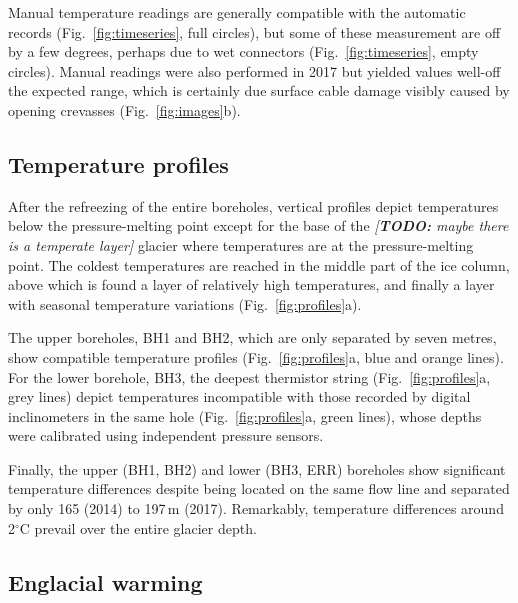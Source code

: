 \documentclass[utf8]{article}
\newcommand{\todo}[1]{\textcolor{c3}{\emph{[\textbf{TODO:} #1]}}}
\begin{document}
    Manual temperature readings are generally compatible with the automatic
    records (Fig.~\ref{fig:timeseries}, full circles), but some of these
    measurement are off by a few degrees, perhaps due to wet connectors
    (Fig.~\ref{fig:timeseries}, empty circles). Manual readings were also
    performed in 2017 but yielded values well-off the expected range, which
    is certainly due surface cable damage visibly caused by opening crevasses
    (Fig.~\ref{fig:images}b).


\subsection{Temperature profiles}

    After the refreezing of the entire boreholes, vertical profiles depict
    temperatures below the pressure-melting point except for the base of the
    \todo{maybe there is a temperate layer}
    glacier where temperatures are at the pressure-melting point. The coldest
    temperatures are reached in the middle part of the ice column, above which
    is found a layer of relatively high temperatures, and finally a layer with
    seasonal temperature variations (Fig.~\ref{fig:profiles}a).

    The upper boreholes, BH1 and BH2, which are only separated by seven metres,
    show compatible temperature profiles (Fig.~\ref{fig:profiles}a, blue and
    orange lines). For the lower borehole, BH3, the deepest thermistor string
    (Fig.~\ref{fig:profiles}a, grey lines) depict temperatures incompatible
    with those recorded by digital inclinometers in the same hole
    (Fig.~\ref{fig:profiles}a, green lines), whose depths were calibrated
    using independent pressure sensors.

    Finally, the upper (BH1, BH2) and lower (BH3, ERR) boreholes show
    significant temperature differences despite being located on the same
    flow line and separated by only 165 (2014) to 197\,m (2017). Remarkably,
    temperature differences
    around 2$^\circ$C prevail over the entire glacier depth.


\subsection{Englacial warming}
\end{document}
